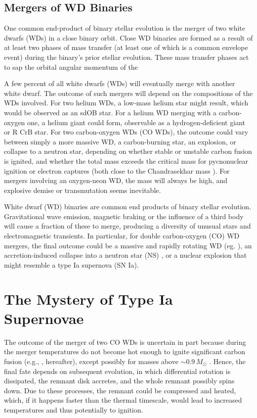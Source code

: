 \subsection{Mergers of WD Binaries}
\label{ssec:wdmergers_sub}

One common end-product of binary stellar evolution is the merger of two white dwarfs (WDs) in a close binary orbit.  Close WD binaries are formed as a result of at least two phases of mass transfer (at least one of which is a common envelope event) during the binary's prior stellar evolution.  These mass transfer phases act to sap the orbital angular momentum of the 


A few percent of all white dwarfs (WDs) will eventually merge with another white dwarf.  The outcome of such mergers will depend on the compositions of the WDs involved.  For two helium WDs, a low-mass helium star might result, which would be observed as an sdOB star.  For a helium WD merging with a carbon-oxygen one, a helium giant could form, observable as a hydrogen-deficient giant or R CrB star.  For two carbon-oxygen WDs (CO WDs), the outcome could vary between simply a more massive WD, a carbon-burning star, an explosion, or collapse to a neutron star, depending on whether stable or unstable carbon fusion is ignited, and whether the total mass exceeds the critical mass for pycnonuclear ignition or electron captures (both close to the Chandrasekhar mass \Mch).  For mergers involving an oxygen-neon WD, the mass will always be high, and explosive demise or transmutation seems inevitable.

White dwarf (WD) binaries are common end products of binary stellar evolution.  Gravitational wave emission, magnetic braking or the influence of a third body will cause a fraction of these to merge, producing a diversity of unusual stars and electromagnetic transients.  In particular, for double carbon-oxygen (CO) WD mergers, the final outcome could be a massive and rapidly rotating WD (eg. \citealt{segrcm97}), an accretion-induced collapse into a neutron star (NS) \citep{saion85}, or a nuclear explosion that might resemble a type Ia supernova (SN Ia). 

\section{The Mystery of Type Ia Supernovae}

The outcome of the merger of two CO WDs is uncertain in part because during the merger temperatures do not become hot enough to ignite significant carbon fusion (e.g., \citealt{loreig09}, \citeal{loreig09} hereafter), except possibly for masses above $\sim\!0.9\,M_\odot$ \citep{pakm+11,pakm+12}.  Hence, the final fate depends on subsequent evolution, in which differential rotation is dissipated, the remnant disk accretes, and the whole remnant possibly spins down.  Due to these processes, the remnant could be compressed and heated, which, if it happens faster than the thermal timescale, would lead to increased temperatures and thus potentially to ignition.  

